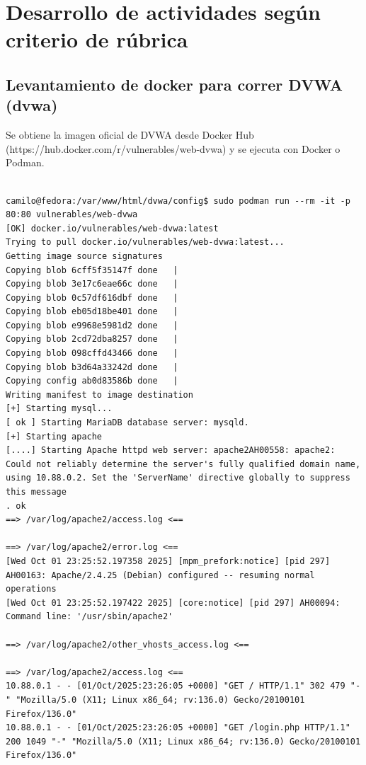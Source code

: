 \documentclass[letterpaper,12pt]{article}
\let\origsubsection\subsection
\renewcommand{\subsection}{\FloatBarrier\origsubsection}
\begin{document}
\section{Desarrollo de actividades según criterio de rúbrica}

\subsection{Levantamiento de docker para correr DVWA (dvwa)}
Se obtiene la imagen oficial de DVWA desde Docker Hub (https://hub.docker.com/r/vulnerables/web-dvwa) y se ejecuta con Docker o Podman.
\begin{verbatim}

camilo@fedora:/var/www/html/dvwa/config$ sudo podman run --rm -it -p 80:80 vulnerables/web-dvwa
[OK] docker.io/vulnerables/web-dvwa:latest
Trying to pull docker.io/vulnerables/web-dvwa:latest...
Getting image source signatures
Copying blob 6cff5f35147f done   | 
Copying blob 3e17c6eae66c done   | 
Copying blob 0c57df616dbf done   | 
Copying blob eb05d18be401 done   | 
Copying blob e9968e5981d2 done   | 
Copying blob 2cd72dba8257 done   | 
Copying blob 098cffd43466 done   | 
Copying blob b3d64a33242d done   | 
Copying config ab0d83586b done   | 
Writing manifest to image destination
[+] Starting mysql...
[ ok ] Starting MariaDB database server: mysqld.
[+] Starting apache
[....] Starting Apache httpd web server: apache2AH00558: apache2: Could not reliably determine the server's fully qualified domain name, using 10.88.0.2. Set the 'ServerName' directive globally to suppress this message
. ok 
==> /var/log/apache2/access.log <==

==> /var/log/apache2/error.log <==
[Wed Oct 01 23:25:52.197358 2025] [mpm_prefork:notice] [pid 297] AH00163: Apache/2.4.25 (Debian) configured -- resuming normal operations
[Wed Oct 01 23:25:52.197422 2025] [core:notice] [pid 297] AH00094: Command line: '/usr/sbin/apache2'

==> /var/log/apache2/other_vhosts_access.log <==

==> /var/log/apache2/access.log <==
10.88.0.1 - - [01/Oct/2025:23:26:05 +0000] "GET / HTTP/1.1" 302 479 "-" "Mozilla/5.0 (X11; Linux x86_64; rv:136.0) Gecko/20100101 Firefox/136.0"
10.88.0.1 - - [01/Oct/2025:23:26:05 +0000] "GET /login.php HTTP/1.1" 200 1049 "-" "Mozilla/5.0 (X11; Linux x86_64; rv:136.0) Gecko/20100101 Firefox/136.0"

\end{verbatim}
\end{document}
